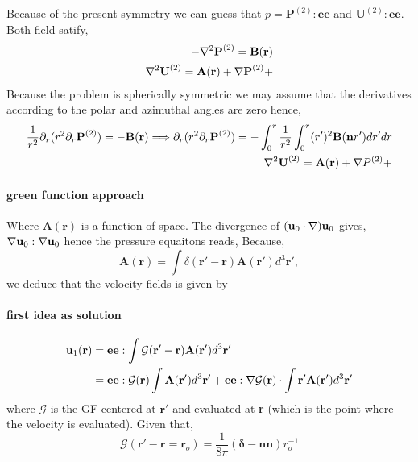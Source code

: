 Because of the present symmetry we can guess that $p = \textbf{P}^{(2)}:\textbf{ee}$ and $\textbf{U}^{(2)}:\textbf{ee}$. 
Both field satify,
\begin{align}
    -\mathbf{\nabla}^2 \textbf{P}^{(2)} = \textbf{B}(\textbf{r})\\
    \mathbf{\nabla}^2 \textbf{U}^{(2)} = \textbf{A}(\textbf{r})+\mathbf{\nabla} \textbf{P}^{(2)}+
\end{align}
Because the problem is spherically symmetric we may assume that the derivatives according to the polar and azimuthal angles are zero hence, 
\begin{align}
    \frac{1}{r^2}\partial_r (r^2 \partial_r \textbf{P}^{(2)}) = -\textbf{B}(\textbf{r})
    \Longrightarrow 
    \partial_r (r^2 \partial_r \textbf{P}^{(2)}) = -\int_0^r \frac{1}{r^2}\int_0^r (r')^2 \textbf{B}(\textbf{n} r') dr' dr
    \\
    \mathbf{\nabla}^2 \textbf{U}^{(2)} = \textbf{A}(\textbf{r})+\mathbf{\nabla} P^{(2)}+
\end{align}








\paragraph{green function approach}
Where $\textbf{A}(\textbf{r})$ is a function of space. 
The divergence of $(\textbf{u}_0 \cdot \mathbf{\nabla}) \textbf{u}_0$ gives, $\mathbf{\nabla} \textbf{u}_0 : \mathbf{\nabla} \textbf{u}_0$ hence the pressure equaitons reads, 
Because,
\begin{equation}
    \textbf{A}(\textbf{r}) = \int \delta(\textbf{r}' - \textbf{r}) \textbf{A}(\textbf{r}') d^3 \textbf{r}',
\end{equation}
we deduce that the velocity fields is given by 
\paragraph{first idea as solution}
\begin{align}
    \textbf{u}_1(\textbf{r})
    &=\textbf{ee}:\int \mathcal{G}(\textbf{r}' - \textbf{r}) \textbf{A}(\textbf{r}') d^3 \textbf{r}'\\
    &=
    \textbf{ee}:  \mathcal{G}( \textbf{r})
    \int  \textbf{A}(\textbf{r}') d^3 \textbf{r}'
    + \textbf{ee}:  \mathbf{\nabla} \mathcal{G}( \textbf{r})\cdot 
    \int \textbf{r}' \textbf{A}(\textbf{r}') d^3 \textbf{r}'
\end{align}
where $\mathcal{G}$ is the GF centered at $\textbf{r}'$ and evaluated at \textbf{r} (which is the point where the velocity is evaluated). 
Given that, 
\begin{equation}
    \mathcal{G}(\textbf{r}'-\textbf{r}=\textbf{r}_o) = \frac{1}{8\pi}(\bm\delta - \textbf{nn})r_o^{-1}
\end{equation}
